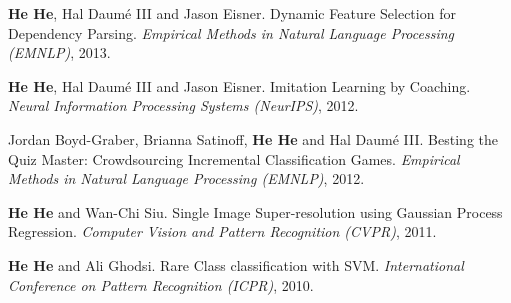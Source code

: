 \textbf{He He}, Hal Daum\'e III and Jason Eisner. Dynamic Feature Selection for Dependency Parsing. \textit{Empirical Methods in Natural Language Processing (EMNLP)}, 2013.

\textbf{He He}, Hal Daum\'e III and Jason Eisner. Imitation Learning by Coaching. \textit{Neural Information Processing Systems (NeurIPS)}, 2012.

Jordan Boyd-Graber, Brianna Satinoff, \textbf{He He} and Hal Daum\'e III. Besting the Quiz Master: Crowdsourcing Incremental Classification Games. \textit{Empirical Methods in Natural Language Processing (EMNLP)}, 2012.

\textbf{He He} and Wan-Chi Siu. Single Image Super-resolution using Gaussian Process Regression. \textit{Computer Vision and Pattern Recognition (CVPR)}, 2011.

\textbf{He He} and Ali Ghodsi. Rare Class classification with SVM. \textit{International Conference on Pattern Recognition (ICPR)}, 2010.

